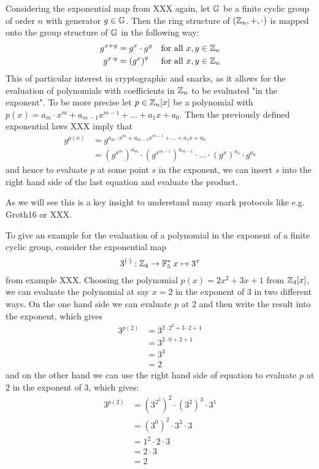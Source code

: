 Considering the exponential map from XXX again, let $\mathbb{G}$ be a finite cyclic group of order $n$ with generator $g\in\mathbb{G}$. Then the ring structure of $(\mathbb{Z}_n,+,\cdot)$ is mapped onto the group structure of $\mathbb{G}$ in the following way:
\begin{align*}
g^{x+y} &= g^x\cdot g^y & \text{for all } x,y\in\mathbb{Z}_n\\
g^{x\cdot y} &= \left( g^x\right)^y & \text{for all } x,y\in\mathbb{Z}_n
\end{align*}
This of particular interest in cryptographic and snarks, as it allows for the evaluation of polynomials with coefficients in $\mathbb{Z}_n$ to be evaluated "in the exponent". To be more precise let $p\in \mathbb{Z}_n[x]$ be a polynomial with $p(x)=a_m\cdot x^m+a_{m-1}x^{m-1}+\ldots + a_1x +a_0$. Then the previously defined exponential laws XXX imply that
\begin{align*}
g^{p(x)} & = g^{a_m\cdot x^m+a_{m-1}x^{m-1}+\ldots + a_1x +a_0}\\
         & = \left(g^{x^m}\right)^{a_m}\cdot \left(g^{x^{m-1}}\right)^{a_{m-1}}\cdot \ldots\cdot \left(g^{x}\right)^{a_1}\cdot g^{a_0}
\end{align*}
and hence to evaluate $p$ at some point $s$ in the exponent, we can insert $s$ into the right hand side of the last equation and evaluate the product.

As we will see this is a key insight to understand many snark protocols like e.g. Groth16 or XXX.
\begin{example} To give an example for the evaluation of a polynomial in the exponent of a finite cyclic group, consider the exponential map
$$
3^{(\cdot)}: \mathbb{Z}_4 \to \mathbb{F}_5^* \; x \mapsto 3^x
$$
from example XXX. Choosing the polynomial $p(x)= 2x^2 +3x +1$ from $\mathbb{Z}_4[x]$, we can evaluate the polynomial at say $x=2$ in the exponent of $3$ in two different ways. On the one hand side we can evaluate $p$ at $2$ and then write the result into the exponent, which gives
\begin{align*}
3^{p(2)} &=3^{2\cdot 2^2+3\cdot 2 +1}\\
          & = 3^{2\cdot 0 +2 +1}\\
          & = 3^{3}\\
          & = 2
\end{align*}
and on the other hand we can use the right hand side of equation to evaluate $p$ at $2$ in the exponent of $3$, which gives:
\begin{align*}
3^{p(2)} &= \left(3^{2^2}\right)^2 \cdot \left(3^{2}\right)^3\cdot 3^1\\
         &= \left(3^{0}\right)^2 \cdot 3^3\cdot 3\\
         &= 1^2 \cdot 2 \cdot 3\\
         &= 2 \cdot 3\\
         &= 2
\end{align*}
\end{example}
